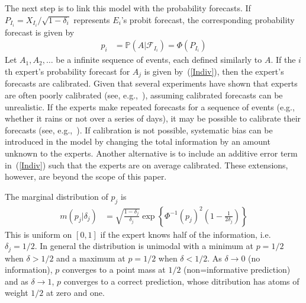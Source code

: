 \documentclass[11pt]{article}
\renewcommand{\P}{\mathbb{P}}
\theoremstyle{definition}
\theoremstyle{definition}
\def\P{{\mathbb P}}
\begin{document}
The next step is to link this model with the probability forecasts. 
If $P_{I_i} = X_{I_i}/\sqrt{1-\delta_i}$ represents $E_i$'s probit 
forecast, the corresponding probability forecast is given by
\begin{align}
p_i &= \P\left(A | \mathcal{F}_{I_i}\right) = \Phi\left( P_{I_i}\right) 
\label{Indiv}
\end{align}
Let $A_1, A_2, \dots$ be a infinite sequence of events, each defined 
similarly to $A$.  If the $i$th expert's probability forecast for 
$A_j$ is given by~(\ref{Indiv}), then the expert's forecasts are
calibrated.  Given that several experiments have shown that experts 
are often poorly calibrated (see, e.g.,~\citealt{cooke1991experts, 
shlyakhter1994quantifying}), assuming calibrated forecasts can be 
unrealistic.  If the experts make repeated forecasts for a sequence 
of events (e.g., whether it rains or not over a series of days), 
it may be possible to calibrate their forecasts (see, 
e.g.,~\citealt{foster1998asymptotic, Brier}).  If calibration is not 
possible, systematic bias can be introduced in the model by 
changing the total information by an amount unknown to the experts. 
Another alternative is to include an additive error term 
in~(\ref{Indiv}) such that the experts are on average calibrated. 
These extensions, however, are beyond the scope of this paper. 

The marginal distribution of $p_j$ is
\begin{align*}
m(p_j | \delta_j) &= \sqrt{\frac{1-\delta_j}{\delta_j}} \exp 
   \left\{ \Phi^{-1}(p_j)^2 \left(1-\frac{1}{2 \delta_j} \right) \right\} 
\end{align*}
This is uniform on $[0,1]$ if the expert knows half of the information, 
i.e. $\delta_j = 1/2$.  In general the distribution is unimodal with
a minimum at $p = 1/2$ when $\delta > 1/2$ and a maximum at $p = 1/2$
when $\delta < 1/2$.  As $\delta \to 0$ (no information), $p$ converges
to a point mass at $1/2$ (non=informative prediction) and as $\delta \to 1$,
$p$ converges to a correct prediction, whose ditribution has atoms of
weight $1/2$ at zero and one.
\end{document}
